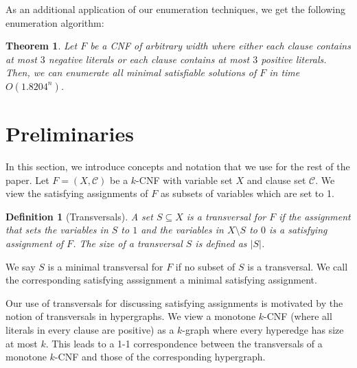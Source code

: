 \documentclass[10pt,a4paper]{article}
\newtheorem{theorem}{Theorem}
\newtheorem{definition}{Definition}
\newcommand{\cC}{\mathcal{C}}
\begin{document}
\bigskip
{} 
As an additional application of our enumeration techniques, we get the following enumeration algorithm:
\begin{theorem}
\label{thm:enum3negate}
Let $F$ be a CNF of arbitrary width where either each clause contains at most $3$ negative literals or each clause contains at most $3$ positive literals. Then, we can enumerate all minimal satisfiable solutions of $F$ in time $O(1.8204^n)$.
\end{theorem}























\section{Preliminaries} \label{sec:preliminaries}

In this section, we introduce concepts and 
notation that we use for the rest of the paper.
Let $F = (X, \cC)$ be a $k$-CNF with variable set $X$ and clause set $\cC$. We view the satisfying assignments of $F$ as 
subsets of variables which are set to 1.

\begin{definition}[Transversals]
A set $S\subseteq X$ is a transversal for $F$ if the assignment that sets
the variables in $S$ to $1$ and the variables in 
$X\setminus S$ to $0$ is a satisfying assignment of $F$.
The size of a transversal $S$ is defined as $|S|$.
\end{definition}

We say $S$ is a minimal transversal for $F$ if no subset of $S$ is a transversal. We call the corresponding satisfying asssignment a minimal satisfying assignment.

Our use of transversals for discussing satisfying assignments is
motivated by the notion of transversals in hypergraphs.
We view a monotone 
$k$-CNF 
(where all literals in every clause are positive) 
as a $k$-graph where every hyperedge has size at most $k$. 
This leads to a 1-1 correspondence
between the transversals of a monotone
$k$-CNF 
and those  of the corresponding hypergraph.
\end{document}
